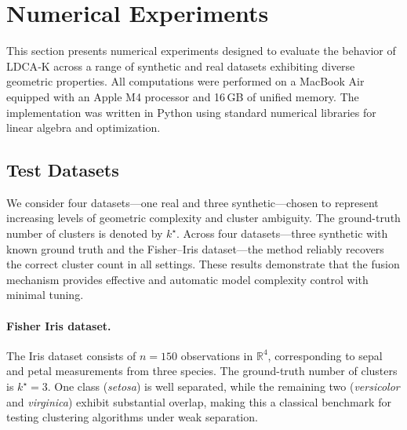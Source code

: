 \documentclass[11pt]{article}
\theoremstyle{definition}
\newcommand{\1}{\mathbf{1}}
\begin{document}

\section{Numerical Experiments}
\label{sec:section8}

This section presents numerical experiments designed to evaluate the behavior of LDCA‑K across a range of synthetic and real datasets exhibiting diverse geometric properties. All computations were performed on a MacBook Air equipped with an Apple M4 processor and 16\,GB of unified memory. The implementation was written in Python using standard numerical libraries for linear algebra and optimization.

\subsection{Test Datasets}

We consider four datasets—one real and three synthetic—chosen to represent increasing levels of geometric complexity and cluster ambiguity. The ground-truth number of clusters is denoted by $k^\star$. Across four datasets—three synthetic with known ground truth and the
Fisher--Iris dataset—the method reliably recovers the correct cluster count in
all settings. These results demonstrate that the fusion mechanism provides effective and automatic model complexity control with minimal tuning.


\paragraph{Fisher Iris dataset.}
The Iris dataset consists of $n=150$ observations in $\mathbb{R}^4$, corresponding to sepal and petal measurements from three species. The ground-truth number of clusters is $k^\star=3$. One class (\emph{setosa}) is well separated, while the remaining two (\emph{versicolor} and \emph{virginica}) exhibit substantial overlap, making this a classical benchmark for testing clustering algorithms under weak separation.
\end{document}
